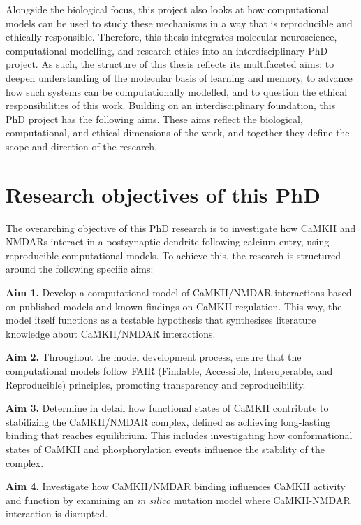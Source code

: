 \documentclass[
  11pt,
  letterpaper,
]{scrreprt}
\begin{document}
Alongside the biological focus, this project also looks at how
computational models can be used to study these mechanisms in a way that
is reproducible and ethically responsible. Therefore, this thesis
integrates molecular neuroscience, computational modelling, and research
ethics into an interdisciplinary PhD project. As such, the structure of
this thesis reflects its multifaceted aims: to deepen understanding of
the molecular basis of learning and memory, to advance how such systems
can be computationally modelled, and to question the ethical
responsibilities of this work. Building on an interdisciplinary
foundation, this PhD project has the following aims. These aims reflect
the biological, computational, and ethical dimensions of the work, and
together they define the scope and direction of the research.

\section*{Research objectives of this
PhD}\label{research-objectives-of-this-phd}


The overarching objective of this PhD research is to investigate how
CaMKII and NMDARs interact in a postsynaptic dendrite following calcium
entry, using reproducible computational models. To achieve this, the
research is structured around the following specific aims:

\textbf{Aim 1.} Develop a computational model of CaMKII/NMDAR
interactions based on published models and known findings on CaMKII
regulation. This way, the model itself functions as a testable
hypothesis that synthesises literature knowledge about CaMKII/NMDAR
interactions.

\textbf{Aim 2.} Throughout the model development process, ensure that
the computational models follow FAIR (Findable, Accessible,
Interoperable, and Reproducible) principles, promoting transparency and
reproducibility.

\textbf{Aim 3.} Determine in detail how functional states of CaMKII
contribute to stabilizing the CaMKII/NMDAR complex, defined as achieving
long-lasting binding that reaches equilibrium. This includes
investigating how conformational states of CaMKII and phosphorylation
events influence the stability of the complex.

\textbf{Aim 4.} Investigate how CaMKII/NMDAR binding influences CaMKII
activity and function by examining an \emph{in silico} mutation model
where CaMKII-NMDAR interaction is disrupted.
\end{document}
